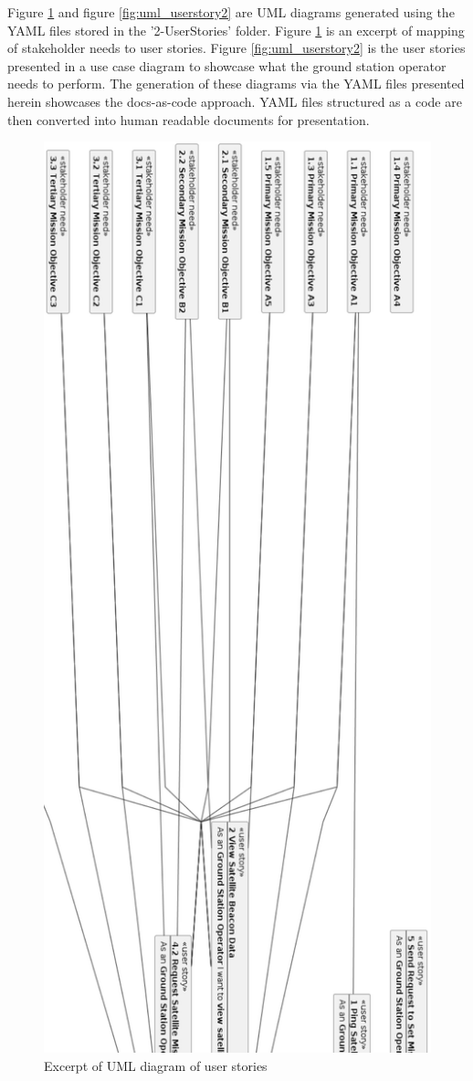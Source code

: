 \documentclass[journal,article,submit,pdftex,moreauthors]{Definitions/mdpi}
\begin{document}
Figure \ref{fig:uml_userstory} and figure \ref{fig:uml_userstory2} are UML diagrams generated using the YAML files stored in the '2-UserStories' folder.  Figure \ref{fig:uml_userstory} is an excerpt of mapping of stakeholder needs to user stories.  Figure \ref{fig:uml_userstory2} is the user stories presented in a use case diagram to showcase what the ground station operator needs to perform.  The generation of these diagrams via the YAML files presented herein showcases the docs-as-code approach.  YAML files structured as a code are then converted into human readable documents for presentation.

\begin{figure}[H]
    \includegraphics[height=21 cm]{assets/uml_userstory.png}
    \caption{Excerpt of UML diagram of user stories}
	\label{fig:uml_userstory}
    \end{figure}   
\unskip
\end{document}
